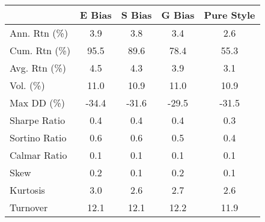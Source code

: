 \begin{tabular}{lcccc}
\toprule
 & E Bias & S Bias & G Bias & Pure Style \\
\midrule
Ann. Rtn (\%) & 3.9 & 3.8 & 3.4 & 2.6 \\
Cum. Rtn (\%) & 95.5 & 89.6 & 78.4 & 55.3 \\
Avg. Rtn (\%) & 4.5 & 4.3 & 3.9 & 3.1 \\
Vol. (\%) & 11.0 & 10.9 & 11.0 & 10.9 \\
Max DD (\%) & -34.4 & -31.6 & -29.5 & -31.5 \\
Sharpe Ratio & 0.4 & 0.4 & 0.4 & 0.3 \\
Sortino Ratio & 0.6 & 0.6 & 0.5 & 0.4 \\
Calmar Ratio & 0.1 & 0.1 & 0.1 & 0.1 \\
Skew & 0.2 & 0.1 & 0.2 & 0.1 \\
Kurtosis & 3.0 & 2.6 & 2.7 & 2.6 \\
Turnover & 12.1 & 12.1 & 12.2 & 11.9 \\
\bottomrule
\end{tabular}
